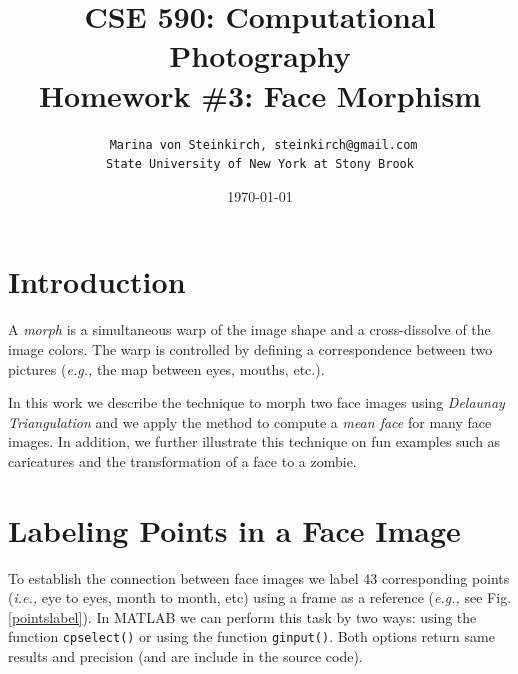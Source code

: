 \documentclass[11pt]{article}
\title{CSE 590: Computational Photography\\  Homework \#3: Face Morphism }
\author{ \texttt{ Marina von Steinkirch, steinkirch@gmail.com}\\
	   \texttt{State University of New York at Stony Brook}}
\date{\today}
\newcommand{\ie}{{\it i.e., }}
\newcommand{\eg}{{\it e.g., }}
\begin{document}
\maketitle
{}  




\section{Introduction}


A {\it morph} is a simultaneous warp of the image shape and a cross-dissolve of the image colors. The warp is controlled by defining a correspondence between two pictures (\eg the map between eyes, mouths, etc.). 


\quad

In this work we describe the technique to morph two face images using {\it Delaunay Triangulation} and we apply the method to compute a {\it mean face} for many face images. In addition, we further illustrate this technique on fun examples such as caricatures and the transformation of a face to a zombie.

\newpage




\section{Labeling Points in a Face Image}

To establish the connection between face images we label 43 corresponding points (\ie eye to eyes, month to month, etc) using a frame as a reference (\eg see Fig. \ref{pointslabel}). In MATLAB we can perform this task by two ways: using the function \texttt{cpselect()} or using the function \texttt{ginput()}. Both options return same results and precision (and are include in the  source code).


\quad
\end{document}
